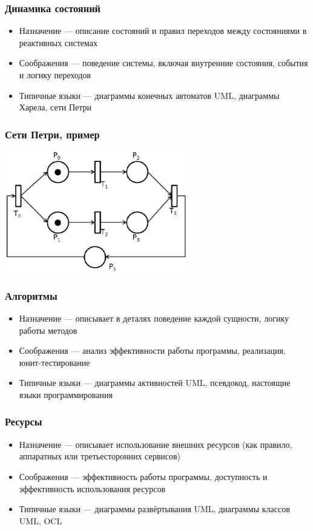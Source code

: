 \documentclass[xetex,mathserif,serif]{beamer}
\begin{document}
	\begin{frame}
		\frametitle{Динамика состояний}
		\begin{itemize}
			\item Назначение --- описание состояний и правил переходов между состояниями в реактивных системах
			\item Соображения --- поведение системы, включая внутренние состояния, события и логику переходов
			\item Типичные языки --- диаграммы конечных автоматов UML, диаграммы Харела, сети Петри
		\end{itemize}
	\end{frame}

	\begin{frame}
		\frametitle{Сети Петри, пример}
		\begin{center}
			\includegraphics[width=0.6\textwidth]{petriNet.png}
		\end{center}
	\end{frame}

	\begin{frame}
		\frametitle{Алгоритмы}
		\begin{itemize}
			\item Назначение --- описывает в деталях поведение каждой сущности, логику работы методов
			\item Соображения --- анализ эффективности работы программы, реализация, юнит-тестирование
			\item Типичные языки --- диаграммы активностей UML, псевдокод, настоящие языки программирования
		\end{itemize}
	\end{frame}

	\begin{frame}
		\frametitle{Ресурсы}
		\begin{itemize}
			\item Назначение --- описывает использование внешних ресурсов (как правило, аппаратных или третьесторонних сервисов)
			\item Соображения --- эффективность работы программы, доступность и эффективность использования ресурсов
			\item Типичные языки --- диаграммы развёртывания UML, диаграммы классов UML, OCL
		\end{itemize}
	\end{frame}
\end{document}
